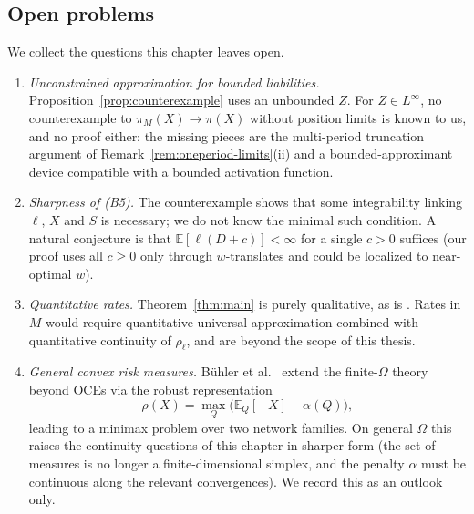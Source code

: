 \documentclass[11pt,a4paper]{report}
\numberwithin{equation}{chapter}
\theoremstyle{plain}
\theoremstyle{definition}
\newcommand{\E}{\mathbb{E}}
\begin{document}
\subsection*{Open problems}

We collect the questions this chapter leaves open.

\begin{enumerate}[leftmargin=*,itemsep=1ex,parsep=0pt]
    \item \emph{Unconstrained approximation for bounded liabilities.} Proposition~\ref{prop:counterexample} uses an unbounded $Z$. For $Z\in L^\infty$, no counterexample to $\pi_M(X)\to\pi(X)$ without position limits is known to us, and no proof either: the missing pieces are the multi-period truncation argument of Remark~\ref{rem:oneperiod-limits}(ii) and a bounded-approximant device compatible with a bounded activation function.
    \item \emph{Sharpness of \textup{(B5)}.} The counterexample shows that some integrability linking $\ell$, $X$ and $S$ is necessary; we do not know the minimal such condition. A natural conjecture is that $\E[\ell(D+c)]<\infty$ for a single $c>0$ suffices (our proof uses all $c\ge0$ only through $w$-translates and could be localized to near-optimal $w$).
    \item \emph{Quantitative rates.} Theorem~\ref{thm:main} is purely qualitative, as is \cite[Proposition~4.3]{buehler}. Rates in $M$ would require quantitative universal approximation combined with quantitative continuity of $\rho_\ell$, and are beyond the scope of this thesis.
    \item \emph{General convex risk measures.} B\"uhler et al.\ \cite[Section~4.5]{buehler} extend the finite-$\Omega$ theory beyond OCEs via the robust representation
          \[
              \rho(X)=\max_{Q}\bigl(\E_Q[-X]-\alpha(Q)\bigr),
          \]
          leading to a minimax problem over two network families. On general $\Omega$ this raises the continuity questions of this chapter in sharper form (the set of measures is no longer a finite-dimensional simplex, and the penalty $\alpha$ must be continuous along the relevant convergences). We record this as an outlook only.
\end{enumerate}
\end{document}
